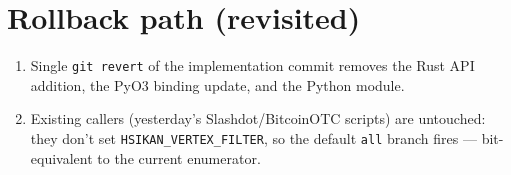 \documentclass[11pt,a4paper]{article}
\begin{document}
\section{Rollback path (revisited)}
\begin{enumerate}
\item Single \texttt{git revert} of the implementation commit removes
  the Rust API addition, the PyO3 binding update, and the Python
  module.
\item Existing callers (yesterday's Slashdot/BitcoinOTC scripts) are
  untouched: they don't set \texttt{HSIKAN\_VERTEX\_FILTER}, so the
  default \texttt{all} branch fires --- bit-equivalent to the current
  enumerator.
\end{enumerate}
\end{document}
